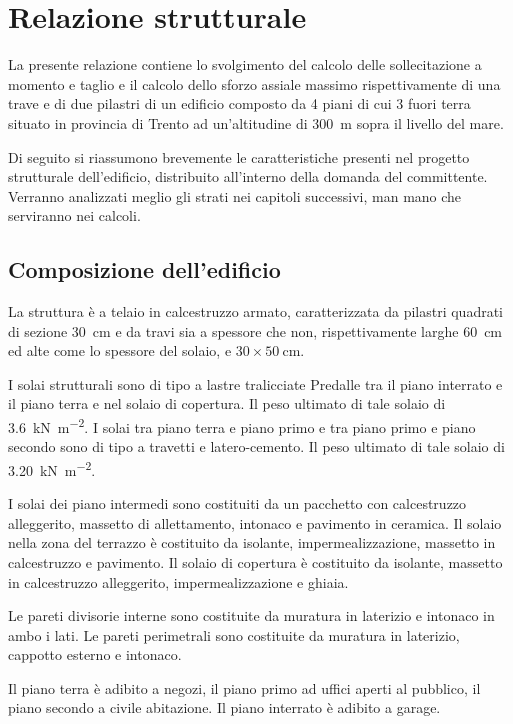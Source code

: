 \chapter{Relazione strutturale}
La presente relazione contiene lo svolgimento del calcolo delle sollecitazione a momento e taglio e il calcolo dello sforzo assiale massimo rispettivamente di una trave e di due pilastri di un edificio composto da 4 piani di cui 3 fuori terra situato in provincia di Trento ad un'altitudine di \SI{300}{\meter} sopra il livello del mare.

Di seguito si riassumono brevemente le caratteristiche presenti nel progetto strutturale dell'edificio, distribuito all'interno della domanda del committente.
Verranno analizzati meglio gli strati nei capitoli successivi, man mano che serviranno nei calcoli.
\section{Composizione dell'edificio}
La struttura è a telaio in calcestruzzo armato, caratterizzata da pilastri quadrati di sezione \SI{30}{\centi\meter} e da travi sia a spessore che non, rispettivamente larghe \SI{60}{\centi\meter} ed alte come lo spessore del solaio, e $30 \times \SI{50}{\centi\metre}$.

I solai strutturali sono di tipo a lastre tralicciate Predalle tra il piano interrato e il piano terra e nel solaio di copertura. 
Il peso ultimato di tale solaio di \SI{3.6}{\kilo\newton\per\square\meter}.
I solai tra piano terra e piano primo e tra piano primo e piano secondo sono di tipo a travetti e latero-cemento.
Il peso ultimato di tale solaio di \SI{3.20}{\kilo\newton\per\square\meter}.

I solai dei piano intermedi sono costituiti da un pacchetto con calcestruzzo alleggerito, massetto di allettamento, intonaco e pavimento in ceramica.
Il solaio nella zona del terrazzo è costituito da isolante, impermealizzazione, massetto in calcestruzzo e pavimento.
Il solaio di copertura è costituito da isolante, massetto in calcestruzzo alleggerito, impermealizzazione e ghiaia.

Le pareti divisorie interne sono costituite da muratura in laterizio e intonaco in ambo i lati.
Le pareti perimetrali sono costituite da muratura in laterizio, cappotto esterno e intonaco.

Il piano terra è adibito a negozi, il piano primo ad uffici aperti al pubblico, il piano secondo a civile abitazione.
Il piano interrato è adibito a garage.

